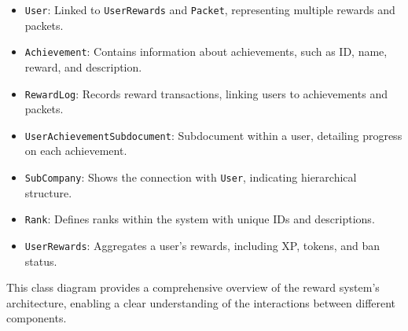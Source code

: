 \begin{itemize}
    \item \texttt{User}: Linked to \texttt{UserRewards} and \texttt{Packet}, representing multiple rewards and packets.
    \item \texttt{Achievement}: Contains information about achievements, such as ID, name, reward, and description.
    \item \texttt{RewardLog}: Records reward transactions, linking users to achievements and packets.
    \item \texttt{UserAchievementSubdocument}: Subdocument within a user, detailing progress on each achievement.
    \item \texttt{SubCompany}: Shows the connection with \texttt{User}, indicating hierarchical structure.
    \item \texttt{Rank}: Defines ranks within the system with unique IDs and descriptions.
    \item \texttt{UserRewards}: Aggregates a user's rewards, including XP, tokens, and ban status.
\end{itemize}

This class diagram provides a comprehensive overview of the reward system's architecture, enabling a clear understanding of the interactions between different components.

